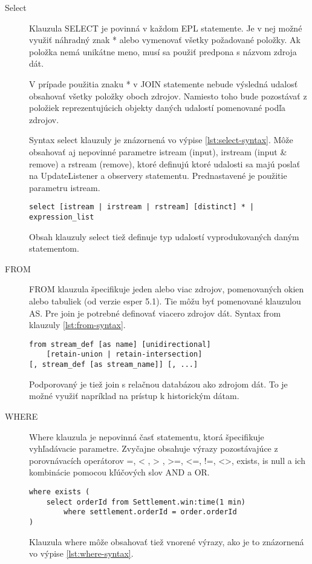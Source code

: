 		\begin{description}
			\item[Select] Klauzula SELECT je povinná v každom EPL statemente. Je v nej možné využiť náhradný znak * alebo vymenovať všetky požadované položky. Ak položka nemá unikátne meno, musí sa použiť predpona s názvom zdroja dát. 
			
			V prípade použitia znaku * v JOIN statemente nebude výsledná udalosť obsahovať všetky položky oboch zdrojov. Namiesto toho bude pozostávať z položiek reprezentujúcich objekty daných udalostí pomenované podľa zdrojov.
			
			Syntax select klauzuly je znázornená vo výpise \ref{lst:select-syntax}. Môže obsahovať aj nepovinné parametre istream (input), irstream (input \& remove) a rstream (remove), ktoré definujú ktoré udalosti sa majú poslať na UpdateListener a observery statementu. Prednastavené je použitie parametru istream.
			\begin{lstlisting}[label=lst:select-syntax,belowskip=-30pt]
select [istream | irstream | rstream] [distinct] * | expression_list
			\end{lstlisting}
			Obsah klauzuly select tiež definuje typ udalostí vyprodukovaných daným statementom.
			
			\item[FROM] FROM klauzula špecifikuje jeden alebo viac zdrojov, pomenovaných okien alebo tabuliek (od verzie esper 5.1). Tie môžu byť pomenované klauzulou AS. Pre join je potrebné definovať viacero zdrojov dát. Syntax from klauzuly \ref{lst:from-syntax}.
			\begin{lstlisting}[label=lst:from-syntax]
from stream_def [as name] [unidirectional]
	[retain-union | retain-intersection] 
[, stream_def [as stream_name]] [, ...]
			\end{lstlisting}
			Podporovaný je tiež join s relačnou databázou ako zdrojom dát. To je možné využiť napríklad na prístup k historickým dátam.
			
			\item[WHERE] Where klauzula je nepovinná časť statementu, ktorá špecifikuje vyhľadávacie parametre. Zvyčajne obsahuje výrazy pozostávajúce z porovnávacích operátorov =, < , > , >=, <=, !=, <>, exists, is null a ich kombinácie pomocou kľúčových slov AND a OR.
			\begin{lstlisting}[label=lst:where-syntax]
where exists (
	select orderId from Settlement.win:time(1 min) 
		where settlement.orderId = order.orderId
)
			\end{lstlisting}
			Klauzula where môže obsahovať tiež vnorené výrazy, ako je to znázornená vo výpise \ref{lst:where-syntax}.
			

\end{description}
